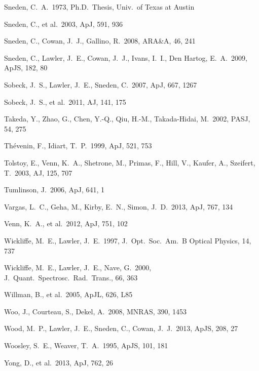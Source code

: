 \documentclass[useAMS,usenatbib,usegraphicx]{mn2e}
\def\apj{ApJ}
\def\aj{AJ}
\def\mnras{MNRAS}
\def\araa{ARA\&A}
\def\apjs{ApJS}
\def\apjl{ApJL}
\def\jqsrt{J.\ Quant.\ Spectrosc.\ Rad.\ Trans.}
\def\pasj{PASJ}
\begin{document}
\begin{thebibliography}{}
 Sneden, C.~A.\ 1973, 
Ph.D.~Thesis, Univ.\ of Texas at Austin

 Sneden, C., 
et al.\ 2003, \apj, 591, 936 

 Sneden, C., 
Cowan, J.~J., Gallino, R.\ 2008, \araa, 46, 241

 Sneden, C., Lawler, J.~E., 
Cowan, J.~J., Ivans, I.~I., Den Hartog, E.~A.\ 2009, \apjs, 182, 80 

 Sobeck, J.~S., Lawler, 
J.~E., Sneden, C.\ 2007, \apj, 667, 1267 

 Sobeck, J.~S., 
et al.\ 2011, \aj, 141, 175 

 Takeda, Y., Zhao, G.,
Chen, Y.-Q., Qiu, H.-M., Takada-Hidai, M.\ 2002, \pasj, 54, 275

 Th{\'e}venin, F., 
Idiart, T.~P.\ 1999, \apj, 521, 753 

 Tolstoy, E., Venn, 
K.~A., Shetrone, M., Primas, F., Hill, V., Kaufer, A., Szeifert, T.\ 
2003, \aj, 125, 707 

 Tumlinson, J.\ 2006, \apj, 641, 1 

 Vargas, L.~C., Geha, M., 
Kirby, E.~N., Simon, J.~D.\ 2013, \apj, 767, 134 

 Venn, K.~A., 
et al.\ 2012, \apj, 751, 102 

 Wickliffe, M.~E., 
Lawler, J.~E.\ 1997, J.\ Opt.\ Soc.\ Am.\ B Optical Physics, 14, 737 

 Wickliffe, M.~E., 
Lawler, J.~E., Nave, G.\ 2000, \jqsrt, 66, 363 

 Willman, B., 
et al.\ 2005, \apjl, 626, L85 

 Woo, J., Courteau, S., 
Dekel, A.\ 2008, \mnras, 390, 1453

 Wood, M.~P., Lawler, J.~E., 
Sneden, C., Cowan, J.~J.\ 2013, \apjs, 208, 27

 Woosley, S.~E., 
Weaver, T.~A.\ 1995, \apjs, 101, 181 

 Yong, D., 
et al.\ 2013, \apj, 762, 26

\end{thebibliography}


\label{lastpage}
\end{document}
